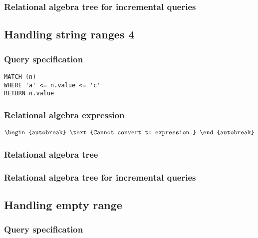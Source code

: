 \subsubsection*{Relational algebra tree for incremental queries}


\subsection{Handling string ranges 4}

\subsubsection*{Query specification}

\begin{lstlisting}
MATCH (n)
WHERE 'a' <= n.value <= 'c'
RETURN n.value
\end{lstlisting}

\subsubsection*{Relational algebra expression}

\begin{align*}
\begin{autobreak}
\text{Cannot convert to expression.}
\end{autobreak}
\end{align*}

\subsubsection*{Relational algebra tree}


\subsubsection*{Relational algebra tree for incremental queries}


\subsection{Handling empty range}

\subsubsection*{Query specification}

